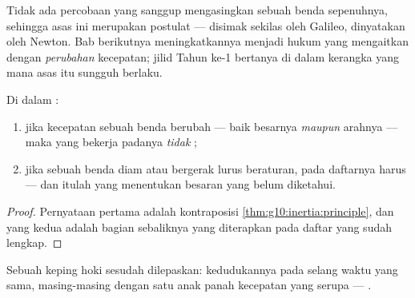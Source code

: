 \begin{remark}
Tidak ada percobaan yang sanggup mengasingkan sebuah benda sepenuhnya,
sehingga asas ini merupakan postulat --- disimak sekilas oleh Galileo,
dinyatakan oleh Newton. Bab berikutnya meningkatkannya menjadi hukum
yang mengaitkan  dengan \emph{perubahan} kecepatan; jilid Tahun ke-1
bertanya di dalam kerangka yang mana asas itu sungguh berlaku.
\end{remark}

\begin{proposition}\label{prop:g10:inertia:converse}
Di dalam :
\begin{enumerate}
  \item jika kecepatan sebuah benda berubah --- baik besarnya
        \emph{maupun} arahnya --- maka  yang bekerja padanya
        \emph{tidak} ;
  \item jika sebuah benda diam atau bergerak lurus beraturan,  pada
        daftarnya harus  --- dan itulah yang menentukan
        besaran yang belum diketahui.
\end{enumerate}
\end{proposition}

\begin{proof}
Pernyataan pertama adalah kontraposisi
\cref{thm:g10:inertia:principle}, dan yang kedua adalah bagian
sebaliknya yang diterapkan pada daftar  yang sudah lengkap.
\end{proof}

\begin{omfigure}

{\small Sebuah keping hoki sesudah dilepaskan: kedudukannya pada selang
waktu yang sama, masing-masing dengan satu anak panah kecepatan yang
serupa --- .}
\end{omfigure}

